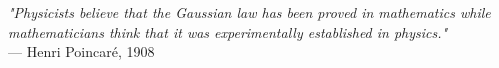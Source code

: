 \begin{flushright}
\emph{"Physicists believe that the Gaussian law has been proved in mathematics while mathematicians think that it was experimentally established in physics."}\\
— Henri Poincaré, 1908
\end{flushright}
